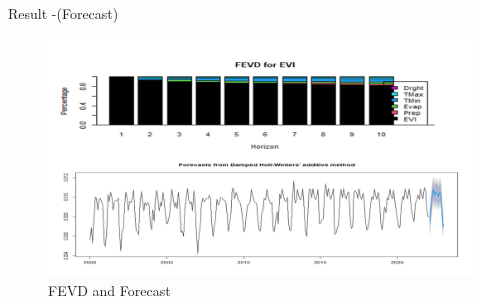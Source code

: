 \documentclass[11pt]{beamer}
\begin{document}
\begin{frame}{Result -(Forecast)}
\begin{figure}
	\centering
	\includegraphics[width=0.7\linewidth]{"images/FEVD and Forecast"}
	\caption{FEVD and Forecast}
	\label{fig:fevd-and-forecast}
\end{figure}

\end{frame}
\end{document}
